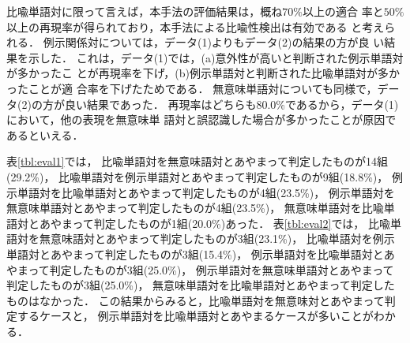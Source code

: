 比喩単語対に限って言えば，本手法の評価結果は，概ね$70\%$以上の適合
率と$50\%$以上の再現率が得られており，本手法による比喩性検出は有効である
と考えられる．
例示関係対については，データ(1)よりもデータ(2)の結果の方が良
い結果を示した．
これは，データ(1)では，(a)意外性が高いと判断された例示単語対が多かったこ
とが再現率を下げ，(b)例示単語対と判断された比喩単語対が多かったことが適
合率を下げたためである．
無意味単語対についても同様で，データ(2)の方が良い結果であった．
再現率はどちらも80.0\%であるから，データ(1)において，他の表現を無意味単
語対と誤認識した場合が多かったことが原因であるといえる．

表\ref{tbl:eval1}では，
比喩単語対を無意味語対とあやまって判定したものが14組(29.2\%)，
比喩単語対を例示単語対とあやまって判定したものが9組(18.8\%)，
例示単語対を比喩単語対とあやまって判定したものが4組(23.5\%)，
例示単語対を無意味単語対とあやまって判定したものが4組(23.5\%)，
無意味単語対を比喩単語対とあやまって判定したものが1組(20.0\%)あった．
表\ref{tbl:eval2}では，
比喩単語対を無意味語対とあやまって判定したものが3組(23.1\%)，
比喩単語対を例示単語対とあやまって判定したものが3組(15.4\%)，
例示単語対を比喩単語対とあやまって判定したものが3組(25.0\%)，
例示単語対を無意味単語対とあやまって判定したものが3組(25.0\%)，
無意味単語対を比喩単語対とあやまって判定したものはなかった．
この結果からみると，比喩単語対を無意味対とあやまって判定するケースと，
例示単語対を比喩単語対とあやまるケースが多いことがわかる．

